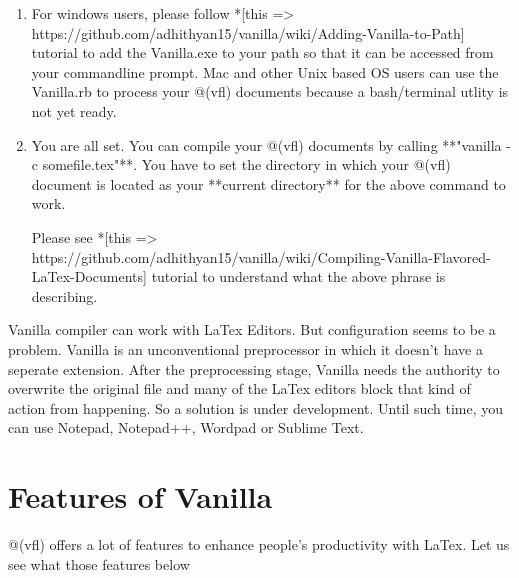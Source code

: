 \documentclass{article}
\begin{document}
\begin{enumerate}
\begin{itemize}
\end{itemize}

\item For windows users, please follow *[this => https://github.com/adhithyan15/vanilla/wiki/Adding-Vanilla-to-Path] tutorial to add the Vanilla.exe to your path so that it can be accessed from your commandline prompt. Mac and other Unix based OS users can use the Vanilla.rb to process your @(vfl) documents because a bash/terminal utlity is not yet ready.

\item You are all set. You can compile your @(vfl) documents by calling **"vanilla -c somefile.tex"**. You have to set the directory in which your @(vfl) document is located as your **current directory** for the above command to work.

Please see *[this => https://github.com/adhithyan15/vanilla/wiki/Compiling-Vanilla-Flavored-LaTex-Documents] tutorial to understand what the above phrase is describing.    
 
\end{enumerate}

Vanilla compiler can work with LaTex Editors. But configuration seems to be a problem. Vanilla is an unconventional preprocessor in which it doesn't have a seperate extension. After the preprocessing stage, Vanilla needs the authority to overwrite the original file and many of the LaTex editors block that kind of action from happening. So a solution is under development. Until such time, you can use Notepad, Notepad++, Wordpad or Sublime Text. 

\section*{Features of Vanilla}

@(vfl) offers a lot of features to enhance people's productivity with LaTex. Let us see what those features below
\end{document}
